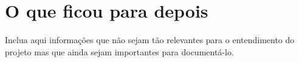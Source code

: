 \chapter{O que ficou para depois}

Inclua aqui informações que não sejam tão relevantes para o entendimento do projeto mas que ainda sejam importantes para documentá-lo. 